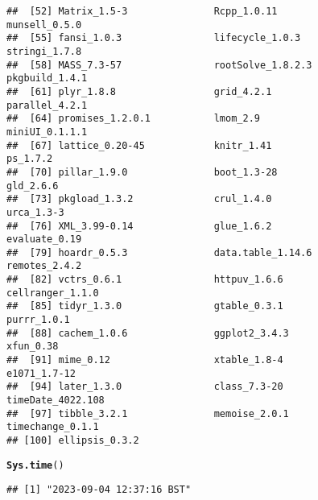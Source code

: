 \documentclass{article}\usepackage[]{graphicx}\usepackage[]{xcolor}
\makeatletter
\newcommand{\hlstd}[1]{\textcolor[rgb]{0.345,0.345,0.345}{#1}}%
\newcommand{\hlkwd}[1]{\textcolor[rgb]{0.737,0.353,0.396}{\textbf{#1}}}%
\newenvironment{kframe}{%
 \def\at@end@of@kframe{}%
 \ifinner\ifhmode%
  \def\at@end@of@kframe{\end{minipage}}%
  \begin{minipage}{\columnwidth}%
 \fi\fi%
 \def\FrameCommand##1{\hskip\@totalleftmargin \hskip-\fboxsep
 \colorbox{shadecolor}{##1}\hskip-\fboxsep
     \hskip-\linewidth \hskip-\@totalleftmargin \hskip\columnwidth}%
 \MakeFramed {\advance\hsize-\width
   \@totalleftmargin\z@ \linewidth\hsize
   \@setminipage}}%
 {\par\unskip\endMakeFramed%
 \at@end@of@kframe}
\newenvironment{knitrout}{}{} %
\makeatother
\begin{document}
\begin{knitrout}
\begin{kframe}
\begin{verbatim}
##  [52] Matrix_1.5-3               Rcpp_1.0.11                munsell_0.5.0             
##  [55] fansi_1.0.3                lifecycle_1.0.3            stringi_1.7.8             
##  [58] MASS_7.3-57                rootSolve_1.8.2.3          pkgbuild_1.4.1            
##  [61] plyr_1.8.8                 grid_4.2.1                 parallel_4.2.1            
##  [64] promises_1.2.0.1           lmom_2.9                   miniUI_0.1.1.1            
##  [67] lattice_0.20-45            knitr_1.41                 ps_1.7.2                  
##  [70] pillar_1.9.0               boot_1.3-28                gld_2.6.6                 
##  [73] pkgload_1.3.2              crul_1.4.0                 urca_1.3-3                
##  [76] XML_3.99-0.14              glue_1.6.2                 evaluate_0.19             
##  [79] hoardr_0.5.3               data.table_1.14.6          remotes_2.4.2             
##  [82] vctrs_0.6.1                httpuv_1.6.6               cellranger_1.1.0          
##  [85] tidyr_1.3.0                gtable_0.3.1               purrr_1.0.1               
##  [88] cachem_1.0.6               ggplot2_3.4.3              xfun_0.38                 
##  [91] mime_0.12                  xtable_1.8-4               e1071_1.7-12              
##  [94] later_1.3.0                class_7.3-20               timeDate_4022.108         
##  [97] tibble_3.2.1               memoise_2.0.1              timechange_0.1.1          
## [100] ellipsis_0.3.2
\end{verbatim}
\begin{alltt}
\hlkwd{Sys.time}\hlstd{()}
\end{alltt}
\begin{verbatim}
## [1] "2023-09-04 12:37:16 BST"
\end{verbatim}
\end{kframe}
\end{knitrout}
\end{document}
